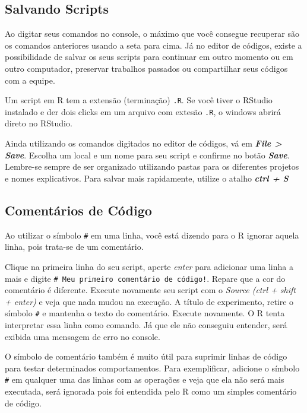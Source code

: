 \documentclass[]{book}
\begin{document}
\subsection{Salvando Scripts}\label{salvando-scripts}

Ao digitar seus comandos no console, o máximo que você consegue
recuperar são os comandos anteriores usando a seta para cima. Já no
editor de códigos, existe a possibilidade de salvar os seus scripts para
continuar em outro momento ou em outro computador, preservar trabalhos
passados ou compartilhar seus códigos com a equipe.

Um script em R tem a extensão (terminação) \texttt{.R}. Se você tiver o
RStudio instalado e der dois clicks em um arquivo com extesão
\texttt{.R}, o windows abrirá direto no RStudio.

Ainda utilizando os comandos digitados no editor de códigos, vá em
\textbf{\emph{File \textgreater{} Save}}. Escolha um local e um nome
para seu script e confirme no botão \textbf{\emph{Save}}. Lembre-se
sempre de ser organizado utilizando pastas para os diferentes projetos e
nomes explicativos. Para salvar mais rapidamente, utilize o atalho
\textbf{\emph{ctrl + S}}

\subsection{Comentários de Código}\label{comentarios-de-codigo}

Ao utilizar o símbolo \texttt{\#} em uma linha, você está dizendo para o
R ignorar aquela linha, pois trata-se de um comentário.

Clique na primeira linha do seu script, aperte \emph{enter} para
adicionar uma linha a mais e digite
\texttt{\#\ Meu\ primeiro\ comentário\ de\ código!}. Repare que a cor do
comentário é diferente. Execute novamente seu script com o
\emph{\emph{Source (ctrl + shift + enter)}} e veja que nada mudou na
execução. A título de experimento, retire o símbolo \texttt{\#} e
mantenha o texto do comentário. Execute novamente. O R tenta interpretar
essa linha como comando. Já que ele não conseguiu entender, será exibida
uma mensagem de erro no console.

O símbolo de comentário também é muito útil para suprimir linhas de
código para testar determinados comportamentos. Para exemplificar,
adicione o símbolo \texttt{\#} em qualquer uma das linhas com as
operações e veja que ela não será mais executada, será ignorada pois foi
entendida pelo R como um simples comentário de código.
\end{document}
